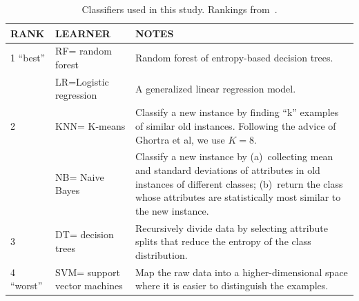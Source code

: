 \documentclass[10pt,conference]{IEEEtran}
\theoremstyle{break}
\theoremstyle{break}
\begin{document}
 \begin{table}[!b]
 \begin{tabular}{l|l|p{5in}}
{\bf RANK} & {\bf LEARNER} & {\bf NOTES}\\\hline
 1 ``best'' & RF= random forest & 
 Random forest of entropy-based decision trees.\\\cline{2-3}
 &  LR=Logistic regression &
 A generalized linear regression
model.\\\hline
 2 & KNN= K-means &  Classify a new instance by finding ``k'' examples of similar old instances.
 Following the advice of Ghortra et al, we use
 $K=8$.\\\cline{2-3}
 & NB= Naive Bayes &  Classify a new instance by (a)~collecting mean and standard deviations of attributes in old instances of  different classes; (b)~return the class whose attributes are statistically most similar to the new instance.\\\hline
 3 & DT= decision trees & Recursively
 divide data by selecting attribute splits
 that reduce the entropy of the class distribution.\\\hline

 4 ``worst'' & SVM= support vector machines &
 Map the raw data into a higher-dimensional space where it is easier to distinguish the examples.
 \\\hline
 \end{tabular}
 \caption{Classifiers used in this study.
 Rankings
 from~\cite{ghotra2015revisiting}.}\label{tbl:learners}
 \end{table}
\end{document}
